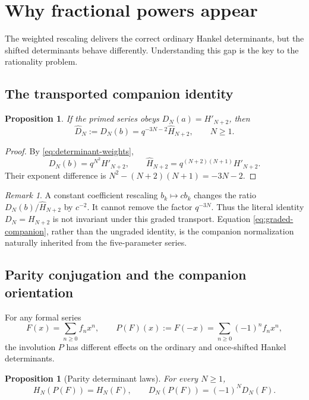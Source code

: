 \documentclass[11pt]{article}
\newtheorem{proposition}[theorem]{Proposition}
\theoremstyle{definition}
\theoremstyle{remark}
\newtheorem{remark}[theorem]{Remark}
\newcommand{\Ha}{\widehat H}
\newcommand{\Da}{\widehat D}
\begin{document}
\section{Why fractional powers appear}
The weighted rescaling delivers the correct ordinary Hankel determinants, but
the shifted determinants behave differently. Understanding this gap is the key
to the rationality problem.

\subsection{The transported companion identity}
\begin{proposition}
If the primed series obeys $D_N(a)=H'_{N+2}$, then
\begin{equation}
 \Da_N:=D_N(b)=q^{-3N-2}\Ha_{N+2},
 \qquad N\geq1.
 \label{eq:graded-companion}
\end{equation}
\end{proposition}
\begin{proof}
By \eqref{eq:determinant-weights},
\[
 D_N(b)=q^{N^2}H'_{N+2},\qquad
 \Ha_{N+2}=q^{(N+2)(N+1)}H'_{N+2}.
\]
Their exponent difference is
$N^2-(N+2)(N+1)=-3N-2$.
\end{proof}

\begin{remark}
A constant coefficient rescaling $b_k\mapsto cb_k$ changes the ratio
$D_N(b)/\Ha_{N+2}$ by $c^{-2}$.  It cannot remove the factor $q^{-3N}$.
Thus the literal identity $D_N=H_{N+2}$ is not invariant under this graded
transport.  Equation \eqref{eq:graded-companion}, rather than the ungraded
identity, is the companion normalization naturally inherited from the
five-parameter series.
\end{remark}

\subsection{Parity conjugation and the companion orientation}
For any formal series
\[
 F(x)=\sum_{n\geq0}f_nx^n,
 \qquad
 P(F)(x):=F(-x)=\sum_{n\geq0}(-1)^nf_nx^n,
\]
the involution $P$ has different effects on the ordinary and once-shifted
Hankel determinants.

\begin{proposition}[Parity determinant laws]
For every $N\geq1$,
\begin{equation}
 H_N(P(F))=H_N(F),\qquad
 D_N(P(F))=(-1)^N D_N(F).
 \label{eq:parity-determinant-laws}
\end{equation}
\end{proposition}
\end{document}
